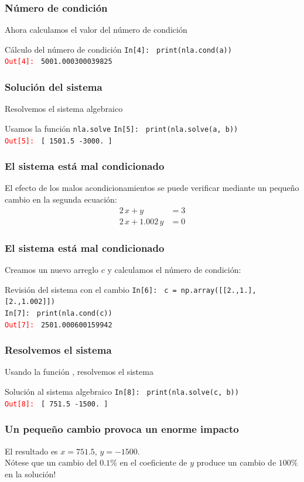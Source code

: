 \begin{frame}[fragile]
\frametitle{Número de condición}
Ahora calculamos el valor del número de condición	
\begin{exampleblock}{Cálculo del número de condición}
\textcolor{ao}{\texttt{In[4]: }} \texttt{print(nla.cond(a))} \\
\medskip
\pause
\textcolor{red}{\texttt{Out[4]: }} \texttt{5001.000300039825}
\end{exampleblock}
\end{frame}
\begin{frame}[fragile]
\frametitle{Solución del sistema}
Resolvemos el sistema algebraico
\begin{exampleblock}{Usamos la función \texttt{nla.solve}}
\textcolor{ao}{\texttt{In[5]: }} \texttt{print(nla.solve(a, b))} \\
\medskip
\pause
\textcolor{red}{\texttt{Out[5]: }} \texttt{[ 1501.5 -3000. ]}
\end{exampleblock}
\end{frame}
\begin{frame}[fragile]
\frametitle{El sistema está mal condicionado}
El efecto de los malos acondicionamientos se puede verificar mediante un pequeño cambio en la segunda ecuación:
\begin{align*}
2 \, x + y &= 3 \\
2 \, x + 1.002 \, y &= 0
\end{align*}
\end{frame}
\begin{frame}[fragile]
\frametitle{El sistema está mal condicionado}
Creamos un nuevo arreglo $c$ y calculamos el número de condición:
\begin{exampleblock}{Revisión del sistema con el cambio}
\textcolor{ao}{\texttt{In[6]: }} \texttt{c = np.array([[2.,1.],[2.,1.002]])} \\
\medskip
\pause
\textcolor{ao}{\texttt{In[7]: }} \texttt{print(nla.cond(c))} \\
\medskip
\pause
\textcolor{red}{\texttt{Out[7]: }} \texttt{2501.000600159942}
\end{exampleblock}
\end{frame}
\begin{frame}[fragile]
\frametitle{Resolvemos el sistema}
Usando la función , resolvemos el sistema
\begin{exampleblock}{Solución al sistema algebraico}
\textcolor{ao}{\texttt{In[8]: }} \texttt{print(nla.solve(c, b))} \\
\medskip
\pause
\textcolor{red}{\texttt{Out[8]: }} \texttt{[  751.5 -1500. ]}
\end{exampleblock}
\end{frame}
\begin{frame}
\frametitle{\large{Un pequeño cambio provoca un enorme impacto}}
El resultado es $x = 751.5$, $y = -1500$.
\\
\bigskip
Nótese que un cambio del $0.1\%$ en el coeficiente de $y$ produce un cambio de $100\%$ en la solución!
\end{frame}
